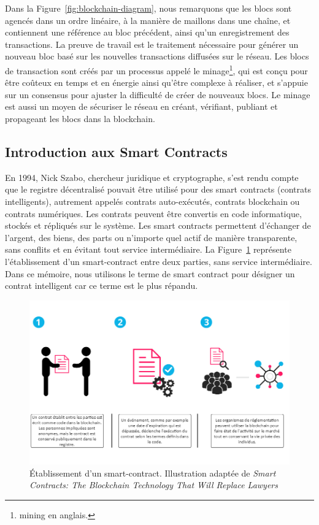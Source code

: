 \documentclass{tnreport}
\begin{document}
Dans la Figure~\ref{fig:blockchain-diagram}, nous remarquons que les blocs sont agencés dans un ordre linéaire, à la manière de maillons dans une chaîne, et contiennent une référence au bloc précédent, ainsi qu'un enregistrement des transactions.
La preuve de travail est le traitement nécessaire pour générer un nouveau bloc basé sur les nouvelles transactions diffusées sur le réseau.
Les blocs de transaction sont créés par un processus appelé le minage\footnote{mining en anglais.}, qui est conçu pour être coûteux en temps et en énergie ainsi qu'être complexe à réaliser, et s'appuie sur un consensus pour ajuster la difficulté de créer de nouveaux blocs. Le minage est aussi un moyen de sécuriser le réseau en créant, vérifiant, publiant et propageant les blocs dans la blockchain.

\subsection{Introduction aux Smart Contracts}

En 1994, Nick Szabo, chercheur juridique et cryptographe, s'est rendu compte que le registre décentralisé pouvait être utilisé pour des smart contracts (contrats intelligents), autrement appelés contrats auto-exécutés, contrats blockchain ou contrats numériques.
Les contrats peuvent être convertis en code informatique, stockés et répliqués sur le système.
Les smart contracts permettent d'échanger de l'argent, des biens, des parts ou n'importe quel actif de manière transparente, sans conflits et en évitant tout service intermédiaire.
La Figure~\ref{fig:smart-contracts} représente l'établissement d'un smart-contract entre deux parties, sans service intermédiaire. Dans ce mémoire, nous utilisons le terme de smart contract pour désigner un contrat intelligent car ce terme est le plus répandu.

\begin{figure}[h]
	\centering
	\includegraphics[scale=0.53]{figures/smart-contracts}
	\caption{Établissement d'un smart-contract. Illustration adaptée de \textit{Smart Contracts: The Blockchain Technology That Will Replace Lawyers}~\cite{smart-contracts}}
	\label{fig:smart-contracts}
\end{figure}
\end{document}
